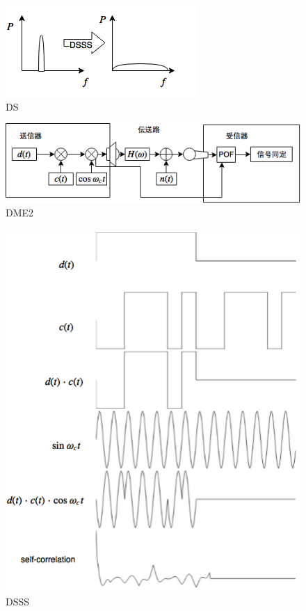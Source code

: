 \begin{figure}[tb]\centering
  \hspace{-2mm}\includegraphics[clip,width=1.1\hsize]{img/DS.png}
  \caption{DS}\label{fig:DS}
\end{figure}

\begin{figure}[tb]\centering
  \hspace{-2mm}\includegraphics[clip,width=1.1\hsize]{img/DME2.png}
  \caption{DME2}\label{fig:DME2}
\end{figure}

\begin{figure}[tb]\centering
  \hspace{-2mm}\includegraphics[clip,width=1.1\hsize]{img/DSSS.png}
  \caption{DSSS}\label{fig:DSSS}
\end{figure}

